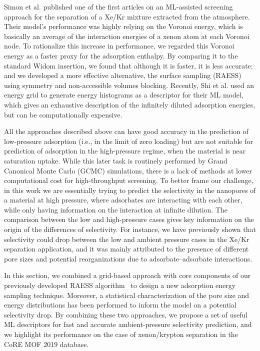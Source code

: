 \documentclass[main]{subfiles}
\begin{document}
Simon et al. published one of the first articles on an ML-assisted screening approach for the separation of a Xe/Kr mixture extracted from the atmosphere.\autocite{Simon_2015} Their model's performance was highly relying on the Voronoi energy, which is basically an average of the interaction energies of a xenon atom at each Voronoi node.\autocite{Rycroft_2009} To rationalize this increase in performance, we regarded this Voronoi energy as a faster proxy for the adsorption enthalpy. By comparing it to the standard Widom insertion, we found that although it is faster, it is less accurate; and we developed a more effective alternative, the surface sampling (RAESS) using symmetry and non-accessible volumes blocking.\autocite{Ren_2023} Recently, Shi et al. used an energy grid to generate energy histograms as a descriptor for their ML model, which gives an exhaustive description of the infinitely diluted adsorption energies,\autocite{Shi_2023} but can be computationally expensive.

All the approaches described above can have good accuracy in the prediction of low-pressure adsorption (i.e., in the limit of zero loading) but are not suitable for prediction of adsorption in the high-pressure regime, when the material is near saturation uptake. While this later task is routinely performed by Grand Canonical Monte Carlo (GCMC) simulations, there is a lack of methods at lower computational cost for high-throughput screening. To better frame our challenge, in this work we are essentially trying to predict the selectivity in the nanopores of a material at high pressure, where adsorbates are interacting with each other, while only having information on the interaction at infinite dilution. The comparison between the low and high-pressure cases gives key information on the origin of the differences of selectivity. For instance, we have previously shown that selectivity could drop between the low and ambient pressure cases in the Xe/Kr separation application, and it was mainly attributed to the presence of different pore sizes and potential reorganizations due to adsorbate--adsorbate interactions.\autocite{Ren_2021}

In this section, we combined a grid-based approach with core components of our previously developed RAESS algorithm~\autocite{Ren_2023} to design a new adsorption energy sampling technique. Moreover, a statistical characterization of the pore size and energy distributions has been performed to inform the model on a potential selectivity drop. By combining these two approaches, we propose a set of useful ML descriptors for fast and accurate ambient-pressure selectivity prediction, and we highlight its performance on the case of xenon/krypton separation in the CoRE MOF 2019 database\autocite{Chung_2019}.
\end{document}
